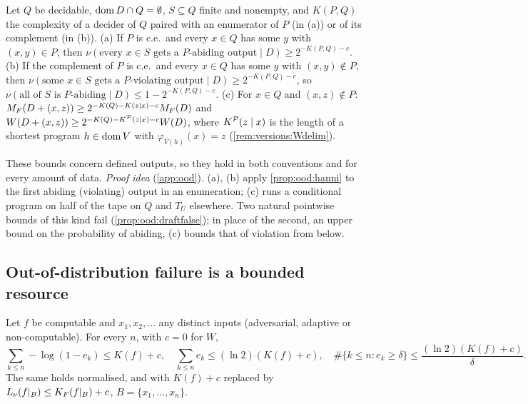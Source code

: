 \begin{theorem}\label{thm:ood:twosided}
Let $Q$ be decidable, $\operatorname{dom} D\cap Q=\emptyset$, $S\subseteq Q$ finite and nonempty, and $K(P,Q)$ the complexity of a decider of $Q$ paired with an enumerator of $P$ (in (a)) or of its complement (in (b)).
(a) If $P$ is c.e.\ and every $x\in Q$ has some $y$ with $(x,y)\in P$, then $\nu(\text{every }x\in S\text{ gets a }P\text{-abiding output}\mid D)\ge2^{-K(P,Q)-c}$.
(b) If the complement of $P$ is c.e.\ and every $x\in Q$ has some $y$ with $(x,y)\notin P$, then $\nu(\text{some }x\in S\text{ gets a }P\text{-violating output}\mid D)\ge2^{-K(P,Q)-c}$, so $\nu(\text{all of }S\text{ is }P\text{-abiding}\mid D)\le1-2^{-K(P,Q)-c}$.
(c) For $x\in Q$ and $(x,z)\notin P$: $M_{F}(D+(x,z))\ge2^{-K(Q)-K(z\mid x)-c}M_{F}(D)$ and $W(D+(x,z))\ge2^{-K(Q)-K^{\mathcal{P}}(z\mid x)-c}W(D)$, where $K^{\mathcal{P}}(z\mid x)$ is the length of a shortest program $h\in\operatorname{dom} V$ with $\varphi_{V(h)}(x)=z$ (\cref{rem:versions:Wdelim}).
\end{theorem}

These bounds concern defined outputs, so they hold in both conventions and for every amount of data. \emph{Proof idea} (\cref{app:ood}). (a), (b) apply \cref{prop:ood:hanni} to the first abiding (violating) output in an enumeration; (c) runs a conditional program on half of the tape on $Q$ and $T_U$ elsewhere. Two natural pointwise bounds of this kind fail (\cref{prop:ood:draftfalse}); in place of the second, an upper bound on the probability of abiding, (c) bounds that of violation from below.

\subsection{Out-of-distribution failure is a bounded resource}\label{sec:ood:budget}

\begin{theorem}\label{thm:ood:cumulative}
Let $f$ be computable and $x_1,x_2,\dots$ any distinct inputs (adversarial, adaptive or non-computable). For every $n$, with $c=0$ for $W$,
\[ \sum_{k\le n}-\log(1-e_k)\le K(f)+c,\quad \sum_{k\le n}e_k\le(\ln2)(K(f)+c),\quad \#\{k\le n:e_k\ge\delta\}\le\frac{(\ln2)(K(f)+c)}{\delta}. \]
The same holds normalised, and with $K(f)+c$ replaced by $L_\nu(f|_B)\le K_{F}(f|_B)+c$, $B=\{x_1,\dots,x_n\}$.
\end{theorem}

